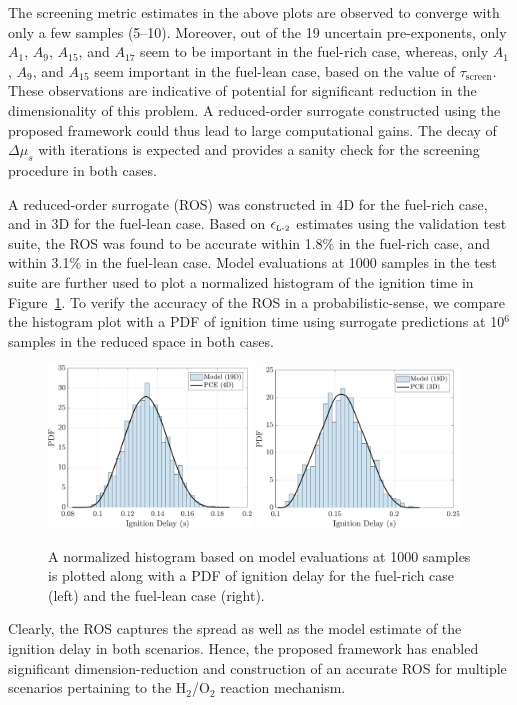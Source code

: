 %
The screening metric estimates in the above plots are observed to converge with
only a few samples (5--10). Moreover, out of the 19 uncertain pre-exponents,
only $A_1$, $A_9$, $A_{15}$, and $A_{17}$ seem to be important in the fuel-rich
case, whereas, only $A_1$, $A_9$, and $A_{15}$ seem important in the fuel-lean
case, based on the value of $\tau_\text{screen}$. These observations are indicative
of potential for significant reduction in the dimensionality of this problem. A reduced-order
surrogate constructed using the proposed framework could thus lead to large computational
gains. The decay of $\Delta\mu_s$ with iterations is expected and provides a sanity check
for the screening procedure in both cases.

A reduced-order surrogate (ROS) was constructed in 4D for the fuel-rich case, and in 3D for
the fuel-lean case. Based on $\epsilon_{\mbox{\tiny{L-2}}}$ estimates using the validation
test suite, the ROS was found to be accurate within 1.8$\%$ in the fuel-rich case, and
within 3.1$\%$ in the fuel-lean case. Model evaluations at 1000 samples in the test suite
are further used to plot a normalized histogram of the ignition time in 
Figure~\ref{fig:pdf_kinetics}. To verify the accuracy of the ROS in a 
probabilistic-sense, we compare the histogram plot with a PDF of ignition time
using surrogate predictions at 10$^{6}$ samples in the reduced space in both cases. 
%
\begin{figure}[htbp]
 \begin{center}
  \includegraphics[width=0.48\textwidth]{./Figures/pdf_comp_rich}
  \includegraphics[width=0.48\textwidth]{./Figures/pdf_comp_lean}
\caption{A normalized histogram based on model evaluations at 1000 samples is plotted
along with a PDF of ignition delay for the fuel-rich case (left) and the fuel-lean
case (right).}
\label{fig:pdf_kinetics}
\end{center}
\end{figure}
%
Clearly, the ROS captures the spread as well as the model estimate of
the ignition delay in both scenarios. Hence, the proposed framework 
has enabled significant dimension-reduction and construction of an accurate
ROS for multiple scenarios pertaining to the H$_2$/O$_2$ reaction
mechanism.    
